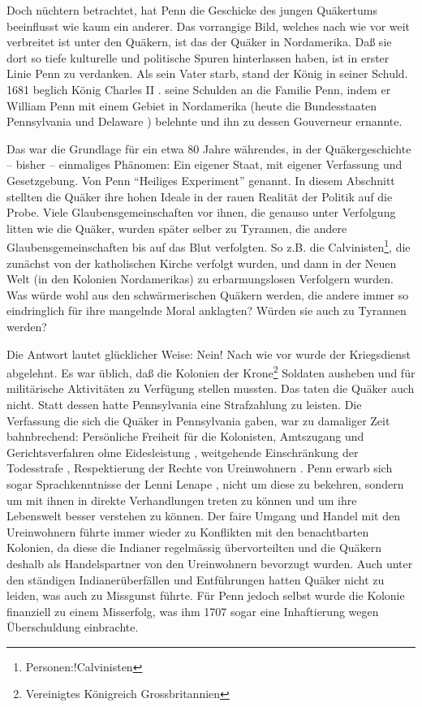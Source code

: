\medskip

Doch nüchtern betrachtet, hat Penn die Geschicke des jungen Quäkertums
beeinflusst wie kaum  ein anderer. Das vorrangige Bild, welches nach wie vor weit
verbreitet ist unter den Quäkern, ist das der Quäker in Nordamerika. Daß sie
dort so tiefe kulturelle und politische Spuren hinterlassen haben, ist in erster
Linie Penn zu verdanken. Als sein Vater starb, stand der König in seiner Schuld.
1681 beglich König Charles II . seine
Schulden  an die Familie Penn, indem er William Penn mit einem
Gebiet in Nordamerika (heute die Bundesstaaten Pennsylvania
 und Delaware ) belehnte und ihn
zu dessen Gouverneur ernannte.

\medskip

Das war die Grundlage für ein etwa 80 Jahre währendes, in der Quäkergeschichte
-- bisher -- einmaliges Phänomen: Ein eigener Staat, mit eigener Verfassung und
Gesetzgebung. Von Penn "`Heiliges Experiment"' genannt. In diesem Abschnitt
stellten die Quäker ihre hohen Ideale in der rauen Realität der Politik auf die
Probe. Viele Glaubensgemeinschaften vor ihnen, die genauso unter Verfolgung
litten wie die Quäker, wurden später selber zu Tyrannen, die andere
Glaubensgemeinschaften bis auf das Blut verfolgten. So z.B. die
Calvinisten\footnote{Personen:!Calvinisten}, die zunächst von der katholischen
Kirche verfolgt wurden, und dann in der Neuen Welt (in den Kolonien
Nordamerikas) zu erbarmungslosen Verfolgern wurden. Was würde wohl aus den
schwärmerischen Quäkern werden, die andere immer so eindringlich für ihre
mangelnde Moral anklagten? Würden sie auch zu Tyrannen werden?

\medskip

Die Antwort lautet glücklicher Weise: Nein! Nach wie vor wurde der Kriegsdienst
abgelehnt. Es war üblich, daß die Kolonien der Krone\footnote{Vereinigtes
Königreich Grossbritannien} Soldaten ausheben und für militärische
Aktivitäten zu Verfügung stellen mussten. Das taten die Quäker auch nicht. Statt
dessen hatte Pennsylvania eine Strafzahlung zu leisten. Die Verfassung die sich
die Quäker in Pennsylvania gaben, war zu damaliger Zeit bahnbrechend: Persönliche
Freiheit für die Kolonisten, Amtszugang und Gerichtsverfahren ohne
Eidesleistung , weitgehende Einschränkung der Todesstrafe
, Respektierung der Rechte von Ureinwohnern
. Penn erwarb sich sogar Sprachkenntnisse
 der Lenni Lenape , nicht
um diese zu bekehren, sondern um mit ihnen in direkte Verhandlungen treten zu
können und um ihre Lebenswelt besser verstehen zu können. Der faire Umgang und
Handel mit den Ureinwohnern führte immer wieder zu Konflikten mit den
benachtbarten Kolonien, da diese die Indianer regelmässig übervorteilten und
die Quäkern deshalb als Handelspartner von den Ureinwohnern bevorzugt wurden.
Auch unter den ständigen Indianerüberfällen und Entführungen
hatten Quäker nicht zu leiden, was auch zu Missgunst führte. Für Penn jedoch
selbst wurde die Kolonie finanziell zu einem Misserfolg, was ihm 1707 sogar eine
Inhaftierung  wegen Überschuldung einbrachte.

